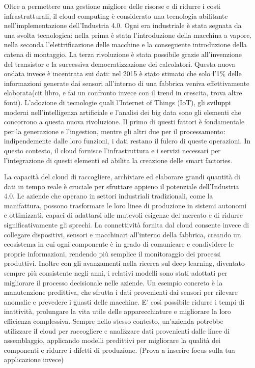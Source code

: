 Oltre a permettere una gestione migliore delle risorse e di ridurre i costi infrastrutturali, il cloud computing è considerato una tecnologia abilitante nell'implementazione dell’Industria 4.0. Ogni era industriale è stata segnata da una svolta tecnologica: nella prima è stata l'introduzione della macchina a vapore, nella seconda l'elettrificazione delle macchine e la conseguente introduzione della catena di montaggio. La terza rivoluzione è stata possibile grazie all'invenzione del transistor e la successiva democratizzazione dei calcolatori. Questa nuova ondata invece è incentrata sui dati: nel 2015 è stato stimato che solo l'1\% delle informazioni generate dai sensori all'interno di una fabbrica veniva effettivamente elaborata(cit libro, e fai un confronto invece con il trend in crescita, trova altre fonti).  L’adozione di tecnologie quali l’Internet of Things (IoT), gli sviluppi moderni nell'intelligenza artificiale e l’analisi dei big data sono gli elementi che concorrono a questa nuova rivoluzione. Il primo di questi fattori è fondamentale per la generazione e l'ingestion, mentre gli altri due per il processamento: indipendemente dalle loro funzioni, i dati restano il fulcro di queste operazioni. In questo contesto, il cloud fornisce l'infrastruttura e i servizi necessari per l'integrazione di questi elementi ed abilita la creazione delle smart factories. 

La capacità del cloud di raccogliere, archiviare ed elaborare grandi quantità di dati in tempo reale è cruciale per sfruttare appieno il potenziale dell’Industria 4.0. Le aziende che operano in settori industriali tradizionali, come la manifattura, possono trasformare le loro linee di produzione in sistemi autonomi e ottimizzati, capaci di adattarsi alle mutevoli esigenze del mercato e di ridurre significativamente gli sprechi. La connettività fornita dal cloud consente invece di collegare dispositivi, sensori e macchinari all'interno della fabbrica, creando un ecosistema in cui ogni componente è in grado di comunicare e condividere le proprie informazioni, rendendo più semplice il monitoraggio dei processi produttivi. Inoltre con gli avanzamenti nella ricerca sul deep learning, diventato sempre più consistente negli anni, i relativi modelli sono stati adottati per migliorare il processo decisionale nelle aziende. Un esempio concreto è la manutenzione predittiva, che sfrutta i dati provenienti dai sensori per rilevare anomalie e prevedere i guasti delle macchine. E' così possibile ridurre i tempi di inattività, prolungare la vita utile delle apparecchiature e migliorare la loro efficienza complessiva. Sempre nello stesso contesto, un'azienda potrebbe utilizzare il cloud per raccogliere e analizzare dati provenienti dalle linee di assemblaggio, applicando modelli predittivi per migliorare la qualità dei componenti e ridurre i difetti di produzione. (Prova a inserire focus sulla tua applicazione invece)

